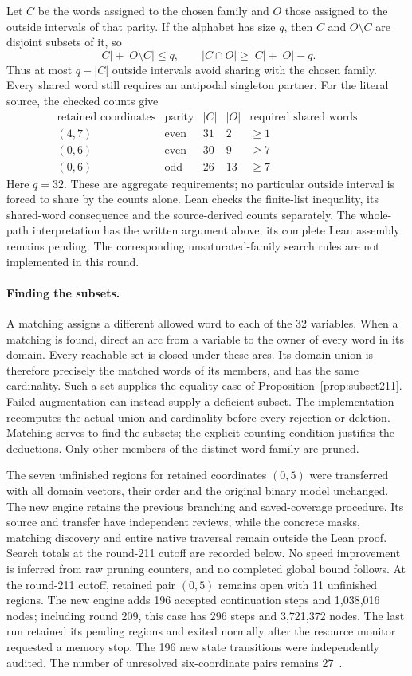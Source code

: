 \documentclass[11pt,a4paper]{article}
\theoremstyle{definition}
\theoremstyle{remark}
\begin{document}
Let $C$ be the words assigned to the chosen family and $O$ those assigned
to the outside intervals of that parity. If the alphabet has size $q$,
then $C$ and $O\setminus C$ are disjoint subsets of it, so
\[
|C|+|O\setminus C|\le q,\qquad
|C\cap O|\ge |C|+|O|-q.
\]
Thus at most $q-|C|$ outside intervals avoid sharing with the chosen
family. Every shared word still requires an antipodal singleton partner.
For the literal source, the checked counts give
\[
\begin{array}{c|c|r|r|r}
\text{retained coordinates}&\text{parity}&|C|&|O|&
\text{required shared words}\\\hline
(4,7)&\text{even}&31&2&\ge1\\
(0,6)&\text{even}&30&9&\ge7\\
(0,6)&\text{odd}&26&13&\ge7
\end{array}
\]
Here $q=32$. These are aggregate requirements; no particular outside
interval is forced to share by the counts alone. Lean checks the
finite-list inequality, its shared-word consequence and the source-derived
counts separately. The whole-path interpretation has the written argument
above; its complete Lean assembly remains pending. The corresponding
unsaturated-family search rules are not implemented in this round.

\paragraph{Finding the subsets.}
A matching assigns a different allowed word to each of the 32 variables.
When a matching is found, direct an arc from a variable to the owner of
every word in its domain. Every reachable set is closed under these arcs.
Its domain union is therefore precisely the matched words of its members,
and has the same cardinality. Such a set supplies the equality case of
Proposition~\ref{prop:subset211}. Failed augmentation can instead supply
a deficient subset. The implementation recomputes the actual union and
cardinality before every rejection or deletion. Matching serves to find
the subsets; the explicit counting condition justifies the deductions.
Only other members of the distinct-word family are pruned.

The seven unfinished regions for retained coordinates $(0,5)$ were
transferred with all domain vectors, their order and the original binary
model unchanged. The new engine retains the previous branching and
saved-coverage procedure. Its source and transfer have independent
reviews, while the concrete masks, matching discovery and entire native
traversal remain outside the Lean proof. Search totals at the round-211
cutoff are recorded below. No speed improvement is inferred from raw
pruning counters, and no completed global bound follows.
At the round-211 cutoff, retained pair $(0,5)$ remains open with
11 unfinished regions. The new engine adds 196 accepted continuation
steps and 1,038,016 nodes; including round 209, this case has 296 steps
and 3,721,372 nodes. The last run retained its pending regions and exited
normally after the resource monitor requested a memory stop. The 196
new state transitions were independently audited. The number of unresolved
six-coordinate pairs remains 27~\cite{research211}.
\end{document}
